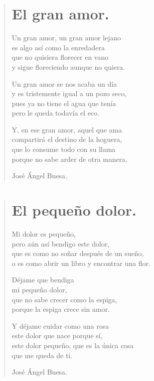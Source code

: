 \documentclass[11pt, portrait, twoside, notitlepage, openright]{book}
\begin{document}
\newpage
\begin{verse}
\begin{center}
\section{El gran amor.}
\end{center}
Un gran amor, un gran amor lejano\\
es algo así como la enredadera\\
que no quisiera florecer en vano\\
y sigue floreciendo aunque no quiera.
\newline

Un gran amor se nos acaba un día\\
y es tristemente igual a un pozo seco,\\
pues ya no tiene el agua que tenía\\
pero le queda todavía el eco.
\newline

Y, en ese gran amor, aquel que ama\\
compartirá el destino de la hoguera,\\
que lo consume todo con su llama\\
porque no sabe arder de otra manera.
\newline

José Ángel Buesa.
\end{verse}

\newpage
\begin{verse}
\begin{center}
\section{El pequeño dolor.}
\end{center}
Mi dolor es pequeño,\\
pero aún así bendigo este dolor,\\
que es como no soñar después de un sueño,\\
o es como abrir un libro y encontrar una flor.
\newline

Déjame que bendiga\\
mi pequeño dolor,\\
que no sabe crecer como la espiga,\\
porque la espiga crece sin amor.
\newline

Y déjame cuidar como una rosa\\
este dolor que nace porque sí,\\
este dolor pequeño, que es la única cosa\\
que me queda de ti.
\newline

José Ángel Buesa.
\end{verse}
\end{document}
